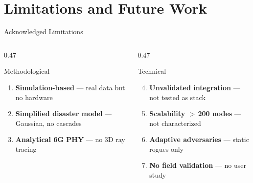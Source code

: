 \documentclass[10pt,aspectratio=169]{beamer}
\begin{document}
\section{Limitations and Future Work}

\begin{frame}[t]{Acknowledged Limitations}
\begin{columns}[T]
\begin{column}{0.47\textwidth}
  \begin{alertblock}{Methodological}
    \begin{enumerate}\footnotesize\setlength{\itemsep}{2pt}
      \item \textbf{Simulation-based} --- real data but no hardware
      \item \textbf{Simplified disaster model} --- Gaussian, no cascades
      \item \textbf{Analytical 6G PHY} --- no 3D ray tracing
    \end{enumerate}
  \end{alertblock}
\end{column}
\begin{column}{0.47\textwidth}
  \begin{alertblock}{Technical}
    \begin{enumerate}\setcounter{enumi}{3}\footnotesize\setlength{\itemsep}{2pt}
      \item \textbf{Unvalidated integration} --- not tested as stack
      \item \textbf{Scalability $>$\,200 nodes} --- not characterized
      \item \textbf{Adaptive adversaries} --- static rogues only
      \item \textbf{No field validation} --- no user study
    \end{enumerate}
  \end{alertblock}
\end{column}
\end{columns}
\end{frame}
\end{document}
